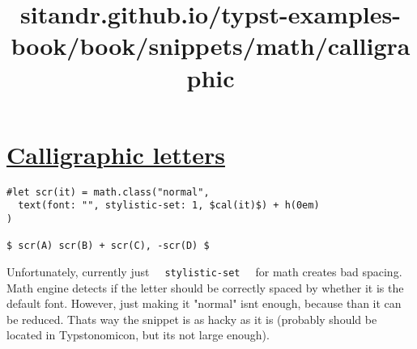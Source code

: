 \title{sitandr.github.io/typst-examples-book/book/snippets/math/calligraphic}

\section{\texorpdfstring{\hyperref[calligraphic-letters]{Calligraphic
letters}}{Calligraphic letters}}\label{calligraphic-letters}

\begin{verbatim}
#let scr(it) = math.class("normal",
  text(font: "", stylistic-set: 1, $cal(it)$) + h(0em)
)

$ scr(A) scr(B) + scr(C), -scr(D) $
\end{verbatim}

\pandocbounded{}

Unfortunately, currently just
\texttt{\ }{\texttt{\ stylistic-set\ }}\texttt{\ } for math creates bad
spacing. Math engine detects if the letter should be correctly spaced by
whether it is the default font. However, just making it "normal"
isn\textquotesingle t enough, because than it can be reduced.
That\textquotesingle s way the snippet is as hacky as it is (probably
should be located in Typstonomicon, but it\textquotesingle s not large
enough).
